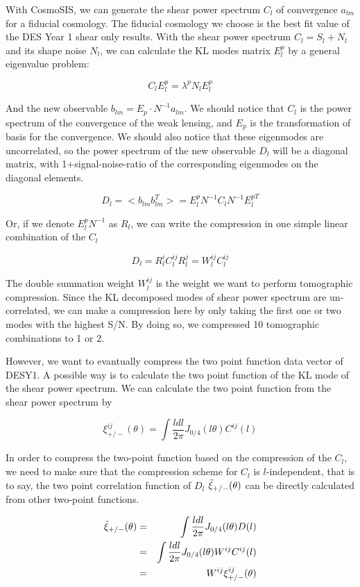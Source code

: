 \documentclass[twocolumn]{\docclass}
\newcommand\be{\begin{equation}}
\newcommand\ee{\end{equation}}
\def\bea{\begin{eqnarray}}
\def\eea{\end{eqnarray}}
\begin{document}
With CosmoSIS, we can generate the shear power spectrum $C_l$ of convergence $a_{lm}$ for a fiducial cosmology. The fiducial cosmology we choose is the best fit value of the DES Year 1 shear only results. With the shear power spectrum $C_l=S_l+N_l$ and its shape noise $N_l$, we can calculate the KL modes matrix $E^p_l$ by a general eigenvalue problem:

\be
C_l E^p_l = \lambda ^p N_l E^p_l
\ee

And the new observable $b_{lm} = E_p \cdot N^{-1} a_{lm}$. We should notice that $C_l$ is the power spectrum of the convergence of the weak lensing, and $E_p$ is the transformation of basis for the convergence. We should also notice that these eigenmodes are uncorrelated, so the power spectrum of the new observable $D_l$ will be a diagonal matrix, with 1+signal-noise-ratio of the corresponding eigenmodes on the diagonal elements.

\be
D_l = <b_{lm} b_{lm}^T> = E^p_l N^{-1} C_l N^{-1} E^{pT}_l
\ee

Or, if we denote $E^p_l N^{-1}$ as $R_l$, we can write the compression in one simple linear combination of the $C_l$

\be
D_l = R_l^i C_l^{ij} R_l^j = W_l^{ij} C_l^{ij}
\ee



The double summation weight $W_l^{ij}$ is the weight we want to perform tomographic compression. Since the KL decomposed modes of shear power spectrum are un-correlated, we can make a compression here by only taking the first one or two modes with the highest S/N. By doing so, we compressed 10 tomographic combinations to 1 or 2.

However, we want to evantually compress the two point function data vector of DESY1. A possible way is to calculate the two point function of the KL mode of the shear power spectrum. We can calculate the two point function from the shear power spectrum by

\be
\xi_{+/-}^{ij}(\theta) = \int \frac{ldl}{2\pi}J_{0/4}(l\theta) C^{ij}(l)
\ee

In order to compress the two-point function based on the compression of the $C_l$, we need to make sure that the compression scheme for $C_l$ is $l$-independent, that is to say, the two point correlation function of $D_l$ $\Tilde{\xi}_{+/-}(\theta)$ can be directly calculated from other two-point functions.

\bea
\nonumber\Tilde{\xi}_{+/-}(\theta) &=& \int \frac{ldl}{2\pi}J_{0/4}(l\theta) D(l)\\\nonumber
&=&\int \frac{ldl}{2\pi}J_{0/4}(l\theta) W^{ij}C^{ij}(l)\\
&=&W^{ij}\xi_{+/-}^{ij}(\theta)
\eea
\end{document}
